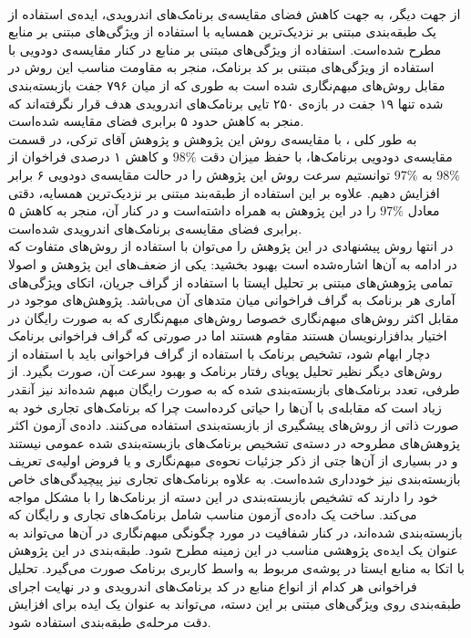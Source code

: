 \\
از جهت دیگر، به جهت کاهش فضای مقایسه‌ی برنامک‌های اندرویدی، ایده‌ی استفاده از یک طبقه‌بندی مبتنی بر نزدیک‌ترین همسایه با استفاده از ويژگی‌های مبتنی بر منابع مطرح شده‌است. استفاده از ویژگی‌های مبتنی بر منابع در کنار مقایسه‌ی دودویی با استفاده از ویژگی‌های مبتنی بر کد برنامک، منجر به مقاومت مناسب این روش در مقابل روش‌های مبهم‌نگاری شده است به طوری که از میان ۷۹۶ جفت‌ بازبسته‌بندی شده تنها ۱۹ جفت در بازه‌ی ۲۵۰ تایی برنامک‌های اندرویدی هدف قرار نگرفته‌اند که منجر به کاهش حدود ۵ برابری فضای مقایسه شده‌است.
\\
به طور کلی ، با مقایسه‌ی روش این پژوهش و پژوهش آقای ترکی، در قسمت مقایسه‌‌ی دودویی برنامک‌ها، با حفظ میزان دقت $98\%$ و کاهش ۱ درصدی فراخوان از $98\%$ به $97\%$ توانستیم سرعت روش این پژوهش را در حالت مقایسه‌ی دودویی ۶ برابر افزایش دهیم. علاوه بر این استفاده از طبقه‌بند مبتنی بر نزدیک‌ترین همسایه، دقتی معادل $97\%$ را در این پژوهش به همراه داشته‌است و در کنار آن، منجر به کاهش ۵ برابری فضای مقایسه‌ی برنامک‌های اندرویدی شده‌است.  \\
در انتها روش پیشنهادی در این پژوهش را می‌توان با استفاده از روش‌های متفاوت که در ادامه به آن‌ها اشاره‌شده است بهبود بخشید:‌
 یکی از ضعف‌های این پژوهش و اصولا تمامی پژوهش‌های مبتنی بر تحلیل ایستا با استفاده از گراف جریان، اتکای ویژگی‌های آماری هر برنامک به گراف فراخوانی میان متد‌های آن می‌باشد. پژوهش‌های موجود در مقابل اکثر روش‌های مبهم‌نگاری خصوصا روش‌های مبهم‌نگاری که به صورت رایگان در اختیار بدافزارنویسان هستند مقاوم هستند اما در صورتی که گراف فراخوانی برنامک‌ دچار ابهام شود، تشخیص برنامک با استفاده از گراف فراخوانی باید با استفاده از روش‌های دیگر نظیر تحلیل پویای رفتار برنامک و بهبود سرعت آن، صورت بگیرد. از طرفی، تعدد برنامک‌های بازبسته‌بندی شده که به صورت رایگان مبهم شده‌اند نیز آنقدر زیاد است که مقابله‌ی با آن‌ها را حیاتی کرده‌است چرا که برنامک‌های تجاری خود به صورت ذاتی از روش‌های پیشگیری از بازبسته‌بندی استفاده می‌کنند. 
 داده‌ی آزمون اکثر پژوهش‌های مطروحه در دسته‌ی تشخیص برنامک‌های بازبسته‌بندی شده عمومی نیستند و در بسیاری از آن‌ها جتی از ذکر جزئیات نحوه‌ی مبهم‌نگاری و یا فروض اولیه‌ی تعریف بازبسته‌بندی نیز خودداری شده‌است. به علاوه برنامک‌های تجاری نیز پیچیدگی‌های خاص خود را دارند که تشخیص بازبسته‌بندی در این دسته از برنامک‌ها را با مشکل مواجه می‌کند. ساخت یک داده‌ی آزمون مناسب شامل برنامک‌های تجاری و رایگان که بازبسته‌بندی شده‌اند، در کنار شفافیت در مورد چگونگی مبهم‌نگاری در آن‌ها می‌تواند به عنوان یک ایده‌ی پژوهشی مناسب در این زمینه مطرح شود. 
 طبقه‌بندی در این پژوهش با اتکا به منابع ایستا در پوشه‌ی مربوط به واسط‌ کاربری برنامک صورت می‌گیرد. تحلیل فراخوانی هر کدام از انواع منابع در کد برنامک‌های اندرویدی و در نهایت اجرای طبقه‌بندی روی ویژگی‌های مبتنی بر این دسته، می‌تواند به عنوان یک ایده‌ برای افزایش دقت مرحله‌ی طبقه‌بندی استفاده شود. 








 